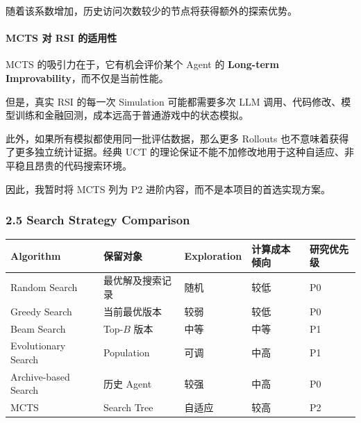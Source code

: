 随着该系数增加，历史访问次数较少的节点将获得额外的探索优势。

\hypertarget{part-3-40-0001-mcts-ux5bf9-rsi-ux7684ux9002ux7528ux6027}{%
\paragraph{MCTS 对 RSI 的适用性}\label{part-3-40-0001-mcts-ux5bf9-rsi-ux7684ux9002ux7528ux6027}}

MCTS 的吸引力在于，它有机会评价某个 Agent 的 \textbf{Long-term Improvability}，而不仅是当前性能。

但是，真实 RSI 的每一次 Simulation 可能都需要多次 LLM 调用、代码修改、模型训练和金融回测，成本远高于普通游戏中的状态模拟。

此外，如果所有模拟都使用同一批评估数据，那么更多 Rollouts 也不意味着获得了更多独立统计证据。经典 UCT 的理论保证不能不加修改地用于这种自适应、非平稳且昂贵的代码搜索环境。

因此，我暂时将 MCTS 列为 P2 进阶内容，而不是本项目的首选实现方案。

\hypertarget{part-3-40-0001-search-strategy-comparison}{%
\subsubsection{2.5 Search Strategy Comparison}\label{part-3-40-0001-search-strategy-comparison}}

\begin{readertable}
\begin{longtable}[]{@{}
  >{\raggedright\arraybackslash}p{}
  >{\raggedright\arraybackslash}p{}
  >{\raggedright\arraybackslash}p{}
  >{\raggedright\arraybackslash}p{}
  >{\raggedright\arraybackslash}p{}@{}}
\toprule
Algorithm & 保留对象 & Exploration & 计算成本倾向 & 研究优先级 \\
\midrule
\endhead
Random Search & 最优解及搜索记录 & 随机 & 较低 & P0 \\
Greedy Search & 当前最优版本 & 较弱 & 较低 & P0 \\
Beam Search & Top-\(B\) 版本 & 中等 & 中等 & P1 \\
Evolutionary Search & Population & 可调 & 中高 & P1 \\
Archive-based Search & 历史 Agent & 较强 & 中高 & P0 \\
MCTS & Search Tree & 自适应 & 较高 & P2 \\
\bottomrule
\end{longtable}
\end{readertable}

